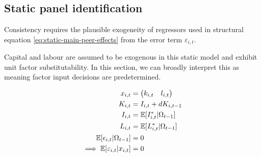 
\subsection{Static panel identification}
\label{ss:static-identification}

Consistency requires the plausible exogeneity of regressors
used in structural equation \eqref{eq:static-main-peer-effects}
from the error term $\varepsilon_{i,t}$.
\par
Capital and labour are assumed to be exogenous in this static model
and exhibit unit factor substitutability.
In this section, we can broadly interpret this as meaning
factor input decisions are predetermined.

\begin{align}
    \notag
    x_{i,t} &=
    \begin{pmatrix}
        k_{i,t} &   l_{i,t}
    \end{pmatrix}
    \\
    \label{eq:static-k-pim}
    K_{i,t} &= I_{i,t} + dK_{i,t-1}
    \\
    \label{eq:static-inv-information}
    I_{i,t} &= \mathbb E[I_{i,t}^*|\Omega_{t-1}]
    \\
    \label{eq:static-l-information}
    L_{i,t} &= \mathbb E[L_{i,t}^*|\Omega_{t-1}]
    \\ \notag
    \mathbb E[\epsilon_{i,t}|\Omega_{t-1}] &= 0 
    \\
    \implies 
    \mathbb E[\varepsilon_{i,t} \vert x_{i,t}] &= 0
\end{align}

